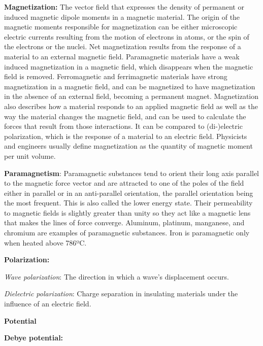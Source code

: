 \begin{list}{}{}
	\item \textbf{Magnetization:} The vector field that expresses the density of permanent or induced magnetic dipole moments in a magnetic material. The origin of the magnetic moments responsible for magnetization can be either microscopic electric currents resulting from the motion of electrons in atoms, or the spin of the electrons or the nuclei. Net magnetization results from the response of a material to an external magnetic field. Paramagnetic materials have a weak induced magnetization in a magnetic field, which disappears when the magnetic field is removed. Ferromagnetic and ferrimagnetic materials have strong magnetization in a magnetic field, and can be magnetized to have magnetization in the absence of an external field, becoming a permanent magnet. Magnetization also describes how a material responds to an applied magnetic field as well as the way the material changes the magnetic field, and can be used to calculate the forces that result from those interactions. It can be compared to (di-)electric polarization, which is the response of a material to an electric field. Physicists and engineers usually define magnetization as the quantity of magnetic moment per unit volume.
	
	\item \textbf{Paramagnetism}: Paramagnetic substances tend to orient their long axis parallel to the magnetic force vector and are attracted to one of the poles of the field either in parallel or in an anti-parallel	orientation, the parallel orientation being the most frequent. This is also called the lower energy state. Their permeability to magnetic fields is slightly greater than unity so they act like a magnetic lens that makes the lines of force converge. Aluminum, platinum, manganese, and chromium are examples of paramagnetic substances. Iron is paramagnetic only when heated above 786ºC.
	
	\item \textbf{Polarization:}
		\begin{list}{}{}
			\item \emph{Wave polarization}: The direction in which a wave's displacement occurs.
			
			\item \emph{Dielectric polarization}: Charge separation in insulating materials under the influence of an electric field.
		\end{list}
	
	\item \textbf{Potential}
	\begin{list}{}{}
		\item \textbf{Debye potential:} 
		

\end{list}
\end{list}
